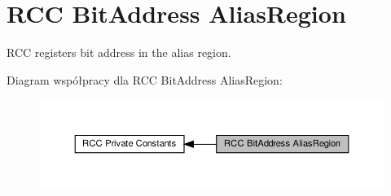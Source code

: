 \hypertarget{group___r_c_c___bit_address___alias_region}{}\section{R\+CC Bit\+Address Alias\+Region}
\label{group___r_c_c___bit_address___alias_region}


R\+CC registers bit address in the alias region.  


Diagram współpracy dla R\+CC Bit\+Address Alias\+Region\+:\nopagebreak
\begin{figure}[H]
\begin{center}
\leavevmode
\includegraphics[width=350pt]{group___r_c_c___bit_address___alias_region}
\end{center}
\end{figure}
